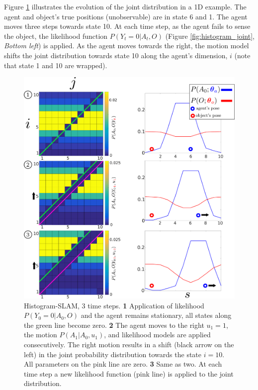Figure \ref{fig:discrete_example} illustrates the evolution of the joint distribution in a 1D example. 
The agent and object's true positions (unobservable) are in state 6 and 1. The agent moves three steps towards state 10. At each time 
step, as the agent fails to sense the object, the likelihood function  $P(Y_t=0|A_t,O)$ (Figure \ref{fig:histogram_joint}, \textit{Bottom left})
is applied. As the agent moves towards the right, the motion model shifts the joint distribution towards state 10 along the agent's 
dimension, $i$ (note that state 1 and 10 are wrapped).

\begin{figure}
 \centering
  \includegraphics[width=\linewidth]{./ch5-MLMF/Figures/explenation/Figure5.pdf}
  \caption{Histogram-SLAM, 3 time steps. \textbf{1} Application of likelihood $P(Y_0=0|A_0,O)$ and the agent remains stationary, all states along the green line become zero.
  \textbf{2} The agent moves to the right $u_1=1$, the motion $P(A_1|A_0,u_1)$, and likelihood models are applied consecutively. The right motion results in a shift (black arrow on the left) in the joint probability 
  distribution towards the state $i=10$. All parameters on the pink line are zero. \textbf{3} Same as two. At each time step a new likelihood function (pink line) is applied to the joint distribution.}
  \label{fig:discrete_example}
\end{figure}

